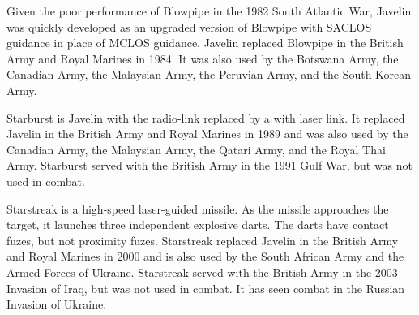 \begin{withcounters}

    Given the poor performance of Blowpipe in the 1982 South Atlantic War, Javelin was quickly developed as an upgraded version of Blowpipe with SACLOS guidance in place of MCLOS guidance.
    Javelin replaced Blowpipe in the British Army and Royal Marines in 1984.
    It was also used by the Botswana Army, the Canadian Army, the Malaysian Army, the Peruvian Army, and the South Korean Army.%


    Starburst is Javelin with the radio-link replaced by a with laser link.
    It replaced Javelin in the British Army and Royal Marines in 1989 and was also used by the Canadian Army, the Malaysian Army, the Qatari Army, and the Royal Thai Army.
    Starburst served with the British Army in the 1991 Gulf War, but was not used in combat.%


    Starstreak is a high-speed laser-guided missile. As the missile approaches the target, it launches three independent explosive darts. The darts have contact fuzes, but not proximity fuzes.
    Starstreak replaced Javelin in the British Army and Royal Marines in 2000 and is also used by the South African Army and the Armed Forces of Ukraine.
    Starstreak served with the British Army in the 2003 Invasion of Iraq, but was not used in combat. It has seen combat in the Russian Invasion of Ukraine.%



\end{withcounters}
